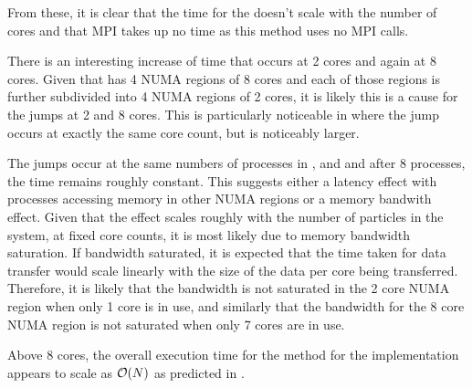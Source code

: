\begin{figure}[!h]
    
    \caption{}
    \label{fig:v0_replicated_individual_operation_32768_time}
\end  {figure}


\vZeroTimeExplanation
    {}
    {}
    {}
    {\individualoperation{}}
    {\replicateddata{}}


From these, it is clear that
the time for the \individualoperation{} doesn't scale with the number
of cores and that MPI takes up no time as this method uses no MPI calls.

There is an interesting increase of time that occurs at 2 cores and again
at 8 cores.
%
Given that \hector{} has 4 NUMA regions of 8 cores and each of those
regions is further subdivided into 4 NUMA regions of 2 cores,
it is likely this is a cause for the jumps at 2 and 8 cores.
%
This is particularly noticeable in
where the jump occurs at exactly the same core count, but is noticeably larger.

The jumps occur at the same numbers of processes in
,
 and
and after 8 processes, the time remains roughly constant.
%
This suggests either a latency effect with processes accessing memory
in other NUMA regions or a memory bandwith effect.
%
Given that the effect scales roughly with the number of particles
in the system, at fixed core counts, it is most likely due to
memory bandwidth saturation.
%
If bandwidth saturated, it is expected that the time taken for
data transfer would
scale linearly with the size of the data per core being transferred.
%
Therefore, it is likely that the bandwidth is not saturated in the 2 core NUMA
region when only 1 core is in use, and
similarly that the bandwidth for the 8 core NUMA region is not saturated
when only 7 cores are in use.

Above 8 cores, the overall execution time for
the \individualoperation{} method for the \replicateddata{} implementation
appears to scale as $\mathcal{O}{\left({ N }\right)}$
as predicted in .


